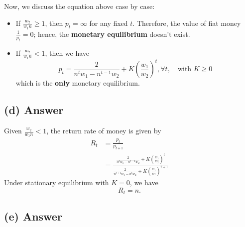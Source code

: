\documentclass[11pt]{article}
\theoremstyle{definition}
\theoremstyle{boldtitle} %
\numberwithin{equation}{section}
\numberwithin{figure}{section}
\numberwithin{table}{section}
\begin{document}
Now, we discuss the equation above case by case:
\begin{itemize}
    \item If $\frac{w_2}{w_1 n} \geq 1$, then $p_t = \infty$ for any fixed $t$. 
    Therefore, the value of fiat money $\frac{1}{p_t} = 0$; hence, the \textbf{monetary equilibrium} doesn't exist.
    \item If $\frac{w_2}{w_1 n} < 1$, then we have 
    \[
        p_t = \frac{2}{n^t w_1 - n^{t-1}w_2} + K \left( \frac{w_1}{w_2}\right)^t, \forall t, \quad \text{with } K \geq 0
    \]
    which is the \textbf{only} monetary equilibrium.
\end{itemize}

\subsection{(d) Answer}
Given $\frac{w_2}{w_1 n} < 1$, the return rate of money is given by 
\begin{align*}
R_t & = \frac{p_t}{p_{t+1}} \\ 
    & = \frac{\frac{2}{n^t w_1 - n^{t-1}w_2} + K \left( \frac{w_1}{w_2}\right)^t}
    {
        \frac{2}{n^{t+1} w_1 - n^{t}w_2} + K \left( \frac{w_1}{w_2}\right)^{t+1}
    }
\end{align*}
Under stationary equilibrium with $K = 0$, we have 
\[
R_t = n.
\]

\subsection{(e) Answer}





\end{document}
